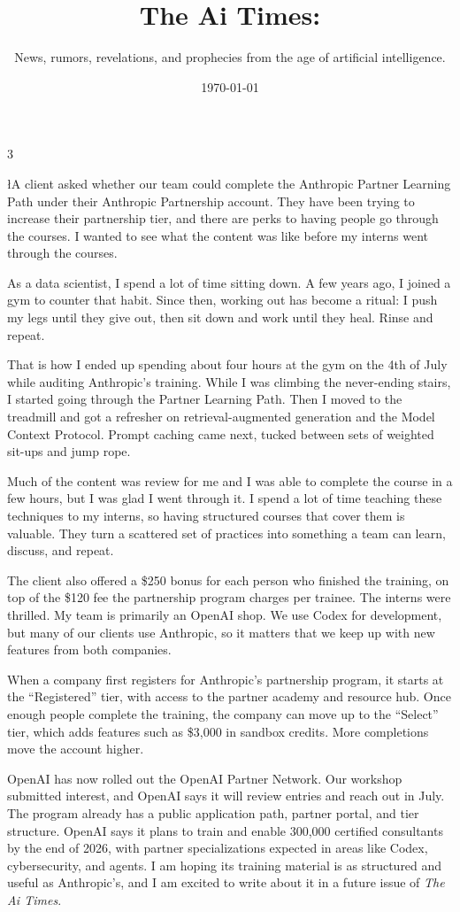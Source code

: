\documentclass{news}
\title    {The Ai Times:}
\subtitle {News, rumors, revelations, and prophecies from the age of artificial intelligence.}
\date     {\today}
\begin{document}
\begin{multicols}{3}


{\l{A} client asked whether our team could complete the Anthropic Partner Learning Path under their Anthropic Partnership account. They have been trying to increase their partnership tier, and there are perks to having people go through the courses. I wanted to see what the content was like before my interns went through the courses.
\par}

As a data scientist, I spend a lot of time sitting down. A few years ago, I joined a gym to counter that habit. Since then, working out has become a ritual: I push my legs until they give out, then sit down and work until they heal. Rinse and repeat.

That is how I ended up spending about four hours at the gym on the 4th of July while auditing Anthropic's training. While I was climbing the never-ending stairs, I started going through the Partner Learning Path. Then I moved to the treadmill and got a refresher on retrieval-augmented generation and the Model Context Protocol. Prompt caching came next, tucked between sets of weighted sit-ups and jump rope.

Much of the content was review for me and I was able to complete the course in a few hours, but I was glad I went through it. I spend a lot of time teaching these techniques to my interns, so having structured courses that cover them is valuable. They turn a scattered set of practices into something a team can learn, discuss, and repeat.

The client also offered a \$250 bonus for each person who finished the training, on top of the \$120 fee the partnership program charges per trainee. The interns were thrilled. My team is primarily an OpenAI shop. We use Codex for development, but many of our clients use Anthropic, so it matters that we keep up with new features from both companies. 

When a company first registers for Anthropic's partnership program, it starts at the ``Registered'' tier, with access to the partner academy and resource hub. Once enough people complete the training, the company can move up to the ``Select'' tier, which adds features such as \$3,000 in sandbox credits. More completions move the account higher.

OpenAI has now rolled out the OpenAI Partner Network. Our workshop submitted interest, and OpenAI says it will review entries and reach out in July. The program already has a public application path, partner portal, and tier structure. OpenAI says it plans to train and enable 300,000 certified consultants by the end of 2026, with partner specializations expected in areas like Codex, cybersecurity, and agents. I am hoping its training material is as structured and useful as Anthropic's, and I am excited to write about it in a future issue of \emph{The Ai Times}.


\end{multicols}
\end{document}
